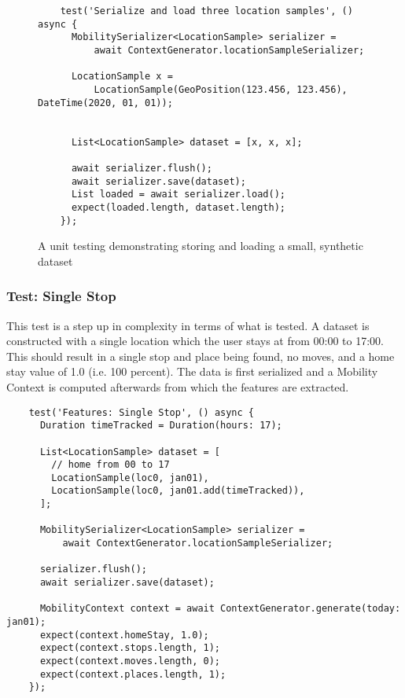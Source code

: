 \begin{figure}
    \centering
    \begin{verbatim}
    test('Serialize and load three location samples', () async {
      MobilitySerializer<LocationSample> serializer =
          await ContextGenerator.locationSampleSerializer;

      LocationSample x =
          LocationSample(GeoPosition(123.456, 123.456), DateTime(2020, 01, 01));


      List<LocationSample> dataset = [x, x, x];

      await serializer.flush();
      await serializer.save(dataset);
      List loaded = await serializer.load();
      expect(loaded.length, dataset.length);
    });
    \end{verbatim}
    \caption{A unit testing demonstrating storing and loading a small, synthetic dataset}
    \label{fig:my_label}
\end{figure}

\subsubsection*{Test: Single Stop}
This test is a step up in complexity in terms of what is tested. A dataset is constructed with a single location which the user stays at from 00:00 to 17:00. This should result in a single stop and place being found, no moves, and a home stay value of 1.0 (i.e. 100 percent). The data is first serialized and a Mobility Context is computed afterwards from which the features are extracted.

\begin{verbatim}
    test('Features: Single Stop', () async {
      Duration timeTracked = Duration(hours: 17);

      List<LocationSample> dataset = [
        // home from 00 to 17
        LocationSample(loc0, jan01),
        LocationSample(loc0, jan01.add(timeTracked)),
      ];

      MobilitySerializer<LocationSample> serializer =
          await ContextGenerator.locationSampleSerializer;

      serializer.flush();
      await serializer.save(dataset);

      MobilityContext context = await ContextGenerator.generate(today: jan01);
      expect(context.homeStay, 1.0);
      expect(context.stops.length, 1);
      expect(context.moves.length, 0);
      expect(context.places.length, 1);
    });
\end{verbatim}

